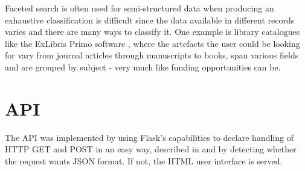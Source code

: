 Faceted search is often used for semi-structured data when producing an exhaustive classification is difficult since the data available in different records varies and there are many ways to classify it. One example is library catalogues like the ExLibris Primo software \cite{primo}, where the artefacts the user could be looking for vary from journal articles through manuscripts to books, span various fields and are grouped by subject - very much like funding opportunities can be.


\section{API}
\label{design-api}
%     
%     
%     

The API was implemented by using Flask's capabilities to declare handling of HTTP GET and POST in an easy way, described in  and by detecting whether the request wants JSON format. If not, the HTML user interface is served.

